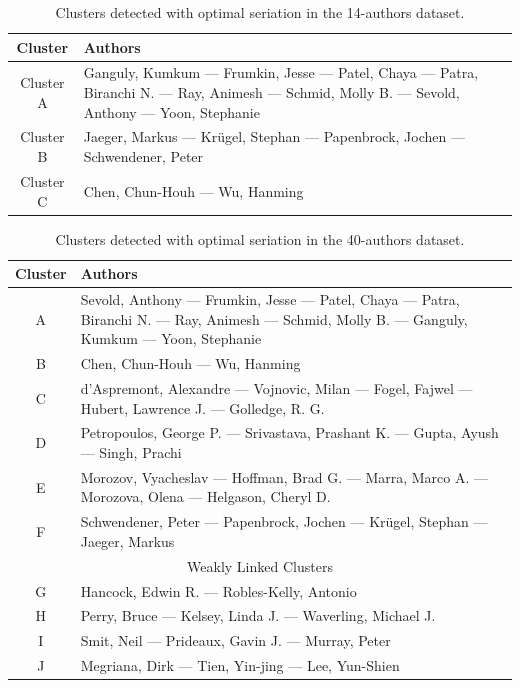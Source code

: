 \documentclass[a4paper,11pt, reqno]{amsart}
\begin{document}
{\begin{table}[ht]
\centering
\renewcommand{\arraystretch}{1.2}
\begin{tabular}{|c|p{11cm}|}
\hline
\textbf{Cluster} & \textbf{Authors} \\
\hline
Cluster A & Ganguly, Kumkum — Frumkin, Jesse — Patel, Chaya — Patra, Biranchi N. — Ray, Animesh — Schmid, Molly B. — Sevold, Anthony — Yoon, Stephanie \\
\hline
Cluster B & Jaeger, Markus — Kr\"ugel, Stephan — Papenbrock, Jochen — Schwendener, Peter \\
\hline
Cluster C & Chen, Chun-Houh — Wu, Hanming \\
\hline
\end{tabular}
\caption{Clusters detected with optimal seriation in the 14-authors dataset.}
\label{table:clusters14}
\end{table}
\begin{table}[ht]
\centering
\renewcommand{\arraystretch}{1.2}
\begin{tabular}{|c|p{12cm}|}
\hline
\textbf{Cluster} & \textbf{Authors} \\
\hline
A & Sevold, Anthony — Frumkin, Jesse — Patel, Chaya — Patra, Biranchi N. — Ray, Animesh — Schmid, Molly B. — Ganguly, Kumkum — Yoon, Stephanie \\
\hline
B & Chen, Chun-Houh — Wu, Hanming \\
\hline
C & d'Aspremont, Alexandre — Vojnovic, Milan — Fogel, Fajwel — Hubert, Lawrence J. — Golledge, R. G. \\
\hline
D & Petropoulos, George P. — Srivastava, Prashant K. — Gupta, Ayush — Singh, Prachi \\
\hline
E & Morozov, Vyacheslav — Hoffman, Brad G. — Marra, Marco A. — Morozova, Olena — Helgason, Cheryl D. \\
\hline
F & Schwendener, Peter — Papenbrock, Jochen — Kr\"ugel, Stephan — Jaeger, Markus \\
\hline
\multicolumn{2}{c}{Weakly Linked Clusters}\\\hline
\rowcolor{gray!15}
G & Hancock, Edwin R. — Robles-Kelly, Antonio \\
\hline
\rowcolor{gray!15}
H  & Perry, Bruce — Kelsey, Linda J. — Waverling, Michael J. \\
\hline
\rowcolor{gray!15}
I & Smit, Neil — Prideaux, Gavin J. — Murray, Peter \\
\hline
\rowcolor{gray!15}
J & Megriana, Dirk — Tien, Yin-jing — Lee, Yun-Shien \\
\hline
\end{tabular}
\caption{Clusters detected with optimal seriation in the 40-authors dataset.}
\label{table:clusters40}
\end{table}

}
\end{document}
